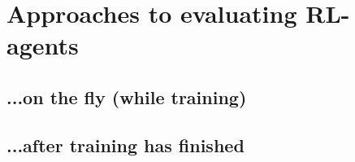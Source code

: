\section{Approaches to evaluating RL-agents}
\subsection{...on the fly (while training)}
\subsection{...after training has finished}